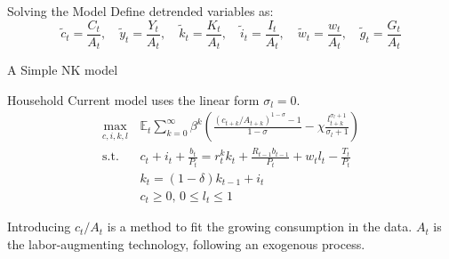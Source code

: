\begin{frame}{Solving the Model}
    Define detrended variables as:
    \begin{equation}
        \tilde{c}_t = \frac{C_t}{A_t}, \quad \tilde{y}_t = \frac{Y_t}{A_t}, \quad \tilde{k}_t = \frac{K_t}{A_t}, \quad \tilde{i}_t = \frac{I_t}{A_t}, \quad \tilde{w}_t = \frac{w_t}{A_t}, \quad
        \tilde{g}_t = \frac{G_t}{A_t}
    \end{equation}
\end{frame}

\begin{frame}{A Simple NK model}
    \begin{block}{Household}
        Current model uses the linear form $\sigma_l=0$.
        \begin{equation}
            \begin{aligned}
                \max\limits_{c, i, k, l} \,&\mathbb{E}_t \sum_{k=0}^{\infty} \beta^k \left(\frac{(c_{t+k} / A_{t+k})^{1-\sigma} - 1}{1 - \sigma} - \chi\frac{l_{t+k}^{\sigma_l + 1}}{\sigma_l + 1}\right)\\
                \text{s.t. }& c_t + i_t + \frac{b_t}{P_t} = r^k_t k_t + \frac{R_{t-1} b_{t-1}}{P_t} + w_t l_t - \frac{T_t}{P_t}\\
                & k_t = (1 - \delta) k_{t-1} + i_t \\
                & c_t \geq 0, \, 0 \leq l_t \leq 1
            \end{aligned}
        \end{equation}

        Introducing $c_t / A_t$ is a method to fit the growing consumption in the data. $A_t$ is the labor-augmenting technology, following an exogenous process.

    \end{block} 
\end{frame}

